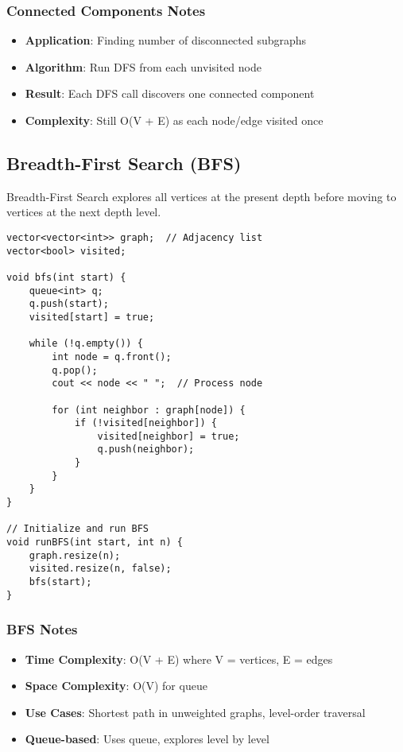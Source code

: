 \documentclass[11pt,a4paper]{article}
\begin{document}
\subsubsection{Connected Components Notes}
\begin{itemize}
\item \textbf{Application}: Finding number of disconnected subgraphs
\item \textbf{Algorithm}: Run DFS from each unvisited node
\item \textbf{Result}: Each DFS call discovers one connected component
\item \textbf{Complexity}: Still O(V + E) as each node/edge visited once
\end{itemize}

\newpage
\subsection{Breadth-First Search (BFS)}
Breadth-First Search explores all vertices at the present depth before moving to vertices at the next depth level.

\begin{lstlisting}[caption={BFS Implementation}]
vector<vector<int>> graph;  // Adjacency list
vector<bool> visited;

void bfs(int start) {
    queue<int> q;
    q.push(start);
    visited[start] = true;
    
    while (!q.empty()) {
        int node = q.front();
        q.pop();
        cout << node << " ";  // Process node
        
        for (int neighbor : graph[node]) {
            if (!visited[neighbor]) {
                visited[neighbor] = true;
                q.push(neighbor);
            }
        }
    }
}

// Initialize and run BFS
void runBFS(int start, int n) {
    graph.resize(n);
    visited.resize(n, false);
    bfs(start);
}
\end{lstlisting}

\subsubsection{BFS Notes}
\begin{itemize}
\item \textbf{Time Complexity}: O(V + E) where V = vertices, E = edges
\item \textbf{Space Complexity}: O(V) for queue
\item \textbf{Use Cases}: Shortest path in unweighted graphs, level-order traversal
\item \textbf{Queue-based}: Uses queue, explores level by level
\end{itemize}
\end{document}
